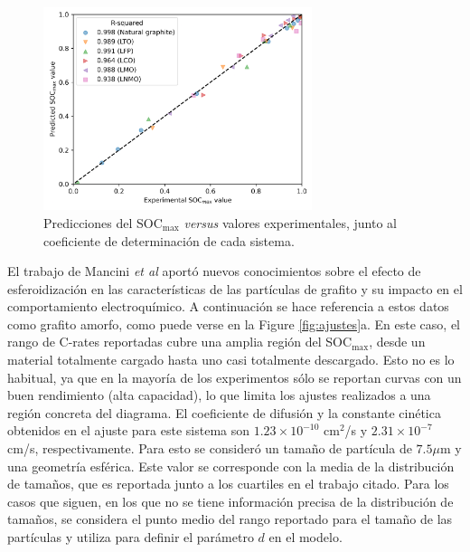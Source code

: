 \begin{figure}[h!]
    \centering
    \includegraphics[width=0.7\textwidth]{FastCharging/un/resultados/ajuste/pred_vs_exp.png}
    \caption{Predicciones del SOC$_{\max}$ \textit{versus} valores 
    experimentales, junto al coeficiente de determinación de cada sistema.}
    \label{fig:pred_vs_exp}
\end{figure}

El trabajo de Mancini \textit{et al} \cite{mancini2022} aportó nuevos 
conocimientos sobre el efecto de esferoidización en las características de las
partículas de grafito y su impacto en el comportamiento electroquímico. A
continuación se hace referencia a estos datos como grafito amorfo, como puede
verse en la Figure \ref{fig:ajustes}a. En este caso, el rango de C-rates
reportadas cubre una amplia región del SOC$_{\max}$, desde un material 
totalmente cargado hasta uno casi totalmente descargado. Esto no es lo habitual,
ya que en la mayoría de los experimentos sólo se reportan curvas con un buen 
rendimiento (alta capacidad), lo que limita los ajustes realizados a una región
concreta del diagrama. El coeficiente de difusión y la constante cinética 
obtenidos en el ajuste para este sistema son $1.23\times10^{-10}$ cm$^2$/s y 
$2.31\times10^{-7}$ cm/s, respectivamente. Para esto se consideró un tamaño
de partícula de $7.5 \mu$m y una geometría esférica. Este valor se corresponde
con la media de la distribución de tamaños, que es reportada junto a los 
cuartiles en el trabajo citado. Para los casos que siguen, en los que no se
tiene información precisa de la distribución de tamaños, se considera el punto
medio del rango reportado para el tamaño de las partículas y utiliza para 
definir el parámetro $d$ en el modelo.

